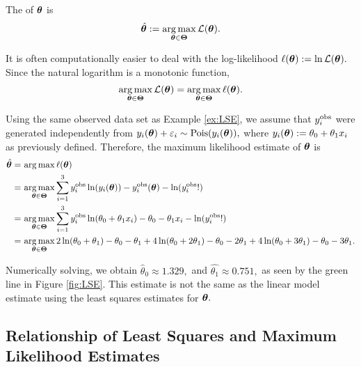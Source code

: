 \begin{definition}
    The  of $\bm{\theta}$ is
    $$
        \hat{\bm{\theta}}
        := \operatorname*{arg\,max}_{\bm{\theta}\in\mathbf{\Theta}} \mathcal{L}(\bm{\theta}).
    $$
\end{definition}

It is often computationally easier to deal with the log-likelihood
$\ell(\bm{\theta}) := \ln\mathcal{L}(\bm{\theta}).$ Since the natural
logarithm is a monotonic function,
$$
    \operatorname*{arg\,max}_{\bm{\theta}\in\mathbf{\Theta}} \mathcal{L}(\bm{\theta})
    = \operatorname*{arg\,max}_{\bm{\theta}\in\mathbf{\Theta}} \ell(\bm{\theta}).
$$

\begin{example}
    Using the same observed data set as Example \ref{ex:LSE}, we assume that
    $y_i^{\mathrm{obs}}$ were generated independently from
    $y_i(\bm{\theta}) + \varepsilon_i \sim \operatorname{Pois}(y_i(\bm{\theta})),$ where
    $y_i(\bm{\theta}) := \theta_0 + \theta_1x_i$ as previously defined. Therefore,
    the maximum likelihood estimate of $\bm{\theta}$ is
    \begin{align*}
        \hat{\bm{\theta}}
        = & \, \operatorname*{arg\,max} \ell(\bm{\theta})                                  \\
        = & \, \operatorname*{arg\,max}_{\bm{\theta}\in\mathbf{\Theta}}\sum_{i = 1}^{3}
        y_i^{\mathrm{obs}}\ln(y_i(\bm{\theta})) -y_i^{\mathrm{obs}}(\bm{\theta}) - \ln(y_i^{\mathrm{obs}}!) \\
        = & \, \operatorname*{arg\,max}_{\bm{\theta}\in\mathbf{\Theta}}\sum_{i = 1}^{3}
        y_i^{\mathrm{obs}}\ln(\theta_0 + \theta_1x_i)
        - \theta_0 - \theta_1x_i
        - \ln(y_i^{\mathrm{obs}}!)                                              \\
        = & \, \operatorname*{arg\,max}_{\bm{\theta}\in\mathbf{\Theta}}
        2\ln(\theta_0 + \theta_1) - \theta_0 - \theta_1
        + 4\ln(\theta_0 + 2\theta_1) - \theta_0 - 2\theta_1
        + 4\ln(\theta_0 + 3\theta_1) - \theta_0 - 3\theta_1.
    \end{align*}
    
    Numerically solving, we obtain $\hat{\theta}_0 \approx 1.329,$
    and $\hat{\theta_1} \approx 0.751,$ as seen by the green line in Figure 
    \ref{fig:LSE}. This estimate is not the same as the linear model
    estimate using the least squares estimates for $\bm{\theta}.$
\end{example}

\subsection*{Relationship of Least Squares and Maximum Likelihood Estimates}

